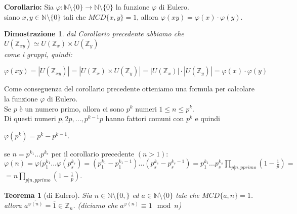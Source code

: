 \documentclass[a4paper,12pt]{article}
\theoremstyle{def}
\theoremstyle{prop}
\theoremstyle{esempio}
\theoremstyle{dimostrazione}
\newtheorem*{dimostrazione}{Dimostrazione}
\theoremstyle{teo}
\newtheorem*{teorema}{Teorema}
\theoremstyle{osservazione}
\begin{document}
\textbf{Corollario:} Sia \(\varphi : \mathbb{N} \setminus \{0\} \rightarrow \mathbb{N} \setminus \{0\}\) la funzione \(\varphi\) di Eulero.\\
siano \(x,y \in \mathbb{N} \setminus \{0\}\) tali che \(MCD\{x,y\} = 1\), allora \(\varphi(xy) = \varphi(x) \cdot \varphi(y)\).\\

\begin{dimostrazione}
	dal Corollario precedente abbiamo che \(U(\mathbb{Z}_{xy}) \simeq U(\mathbb{Z}_x) \times U(\mathbb{Z}_y)\)\\
	come i gruppi, quindi:
	\begin{center}
		\(\varphi(xy) = |U(\mathbb{Z}_{xy})| = |U(\mathbb{Z}_x) \times U(\mathbb{Z}_y)| = |U(\mathbb{Z}_x)| \cdot |U(\mathbb{Z}_y)| = \varphi(x) \cdot \varphi(y)\)
	\end{center}
\end{dimostrazione}
\newpage

Come conseguenza del corollario precedente otteniamo una formula per calcolare \\
la funzione \(\varphi\) di Eulero.\\
Se \(p\) è un numero primo, allora ci sono \(p^k\) numeri \(1 \leq n \leq p^k\).\\
Di questi numeri \(p, 2p, ... , p^{k-1}p\) hanno fattori comuni con \(p^k\) e quindi
\begin{center}
	\(\varphi(p^k) = p^k - p^{k-1}\).\\
\end{center}
se \(n = p^{k_1}...p^{k_s}\) per il corollario precedente \((n>1)\):\\
\(\varphi(n)= \varphi(p_1^{k_1}...\varphi(p_s^{k_s}) = (p_1^{k_1}-p_1^{k_1-1})...(p_s^{k_s}-p_s^{k_s-1}) = p_1^{k_1}...p_s^{k_s}\prod_{p|n, p primo}(1-\frac{1}{p}) = \)\\
\(= n \prod_{p|n, p primo}(1-\frac{1}{p})\).\\

\begin{teorema}[di Eulero]
	Sia \(n \in \mathbb{N} \setminus \{0,\}\) ed \(a \in \mathbb{N} \setminus \{0\}\) tale che \(MCD\{a,n\} = 1\).\\
	allora \(a^{\overline{\varphi(n)}} = \overline{1} \in \mathbb{Z}_n\). (diciamo che \(a^{\varphi(n)} \equiv 1 \mod n\))\\
\end{teorema}
\end{document}

